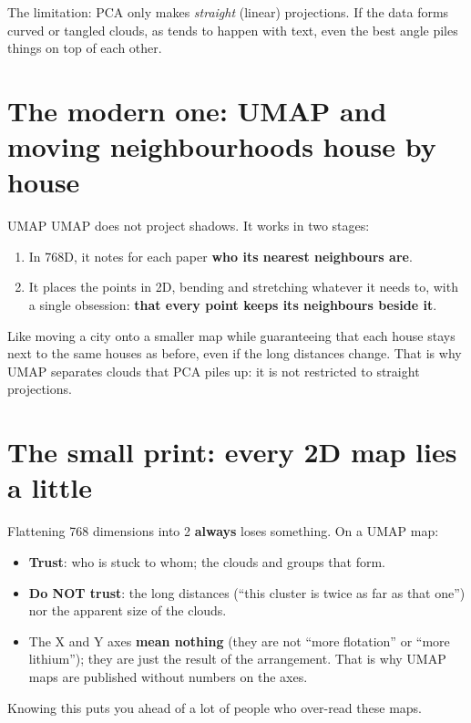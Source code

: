 \documentclass[11pt,a4paper]{article}
\begin{document}
The limitation: PCA only makes \emph{straight} (linear) projections. If the data forms curved
or tangled clouds, as tends to happen with text, even the best angle piles things on top of
each other.

\section{The modern one: UMAP and moving neighbourhoods house by house}

\begin{concepto}{UMAP}
UMAP does not project shadows. It works in two stages:
\begin{enumerate}
  \item In 768D, it notes for each paper \textbf{who its nearest neighbours are}.
  \item It places the points in 2D, bending and stretching whatever it needs to, with a single
        obsession: \textbf{that every point keeps its neighbours beside it}.
\end{enumerate}
Like moving a city onto a smaller map while guaranteeing that each house stays next to the
same houses as before, even if the long distances change. That is why UMAP separates clouds
that PCA piles up: it is not restricted to straight projections.
\end{concepto}

\section{The small print: every 2D map lies a little}

\begin{ojo}
Flattening 768 dimensions into 2 \textbf{always} loses something. On a UMAP map:
\begin{itemize}
  \item \textbf{Trust}: who is stuck to whom; the clouds and groups that form.
  \item \textbf{Do NOT trust}: the long distances (``this cluster is twice as far as that
        one'') nor the apparent size of the clouds.
  \item The X and Y axes \textbf{mean nothing} (they are not ``more flotation'' or ``more
        lithium''); they are just the result of the arrangement. That is why UMAP maps are
        published without numbers on the axes.
\end{itemize}
Knowing this puts you ahead of a lot of people who over-read these maps.
\end{ojo}
\end{document}
